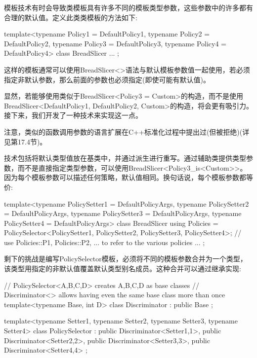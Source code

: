 模板技术有时会导致类模板具有许多不同的模板类型参数，这些参数中的许多都有合理的默认值。定义此类类模板的方法如下:

\begin{cpp}
template<typename Policy1 = DefaultPolicy1,
		typename Policy2 = DefaultPolicy2,
		typename Policy3 = DefaultPolicy3,
		typename Policy4 = DefaultPolicy4>
class BreadSlicer {
	...
};
\end{cpp}

这样的模板通常可以使用BreadSlicer<>语法与默认模板参数值一起使用，若必须指定非默认参数，那么前面的参数也必须指定(即使可能有默认值)。

显然，若能够使用类似于BreadSlicer<Policy3 = Custom>的构造，而不是使用BreadSlicer<DefaultPolicy1, DefaultPolicy2, Custom>的构造，将会更有吸引力。接下来，我们开发了一种技术来实现这一点。

\begin{notice}注意，类似的函数调用参数的语言扩展在C++标准化过程中提出过(但被拒绝)(详见第17.4节)。
\end{notice}

技术包括将默认类型值放在基类中，并通过派生进行重写。通过辅助类提供类型参数，而不是直接指定类型参数，可以使用BreadSlicer<Policy3\_is<Custom>{}>。因为每个模板参数可以描述任何策略，默认值相同。换句话说，每个模板参数都等价:

\begin{cpp}
template<typename PolicySetter1 = DefaultPolicyArgs,
		typename PolicySetter2 = DefaultPolicyArgs,
		typename PolicySetter3 = DefaultPolicyArgs,
		typename PolicySetter4 = DefaultPolicyArgs>
class BreadSlicer {
	using Policies = PolicySelector<PolicySetter1, PolicySetter2,
									PolicySetter3, PolicySetter4>;
	// use Policies::P1, Policies::P2, ... to refer to the various policies
	...
};
\end{cpp}

剩下的挑战是编写PolicySelector模板，必须将不同的模板参数合并为一个类型，该类型用指定的非默认值覆盖默认类型别名成员。这种合并可以通过继承实现:

\begin{cpp}
// PolicySelector<A,B,C,D> creates A,B,C,D as base classes
// Discriminator<> allows having even the same base class more than once
template<typename Base, int D>
class Discriminator : public Base {
};

template<typename Setter1, typename Setter2,
		typename Setter3, typename Setter4>
class PolicySelector : public Discriminator<Setter1,1>,
						public Discriminator<Setter2,2>,
						public Discriminator<Setter3,3>,
						public Discriminator<Setter4,4> {
};
\end{cpp}

